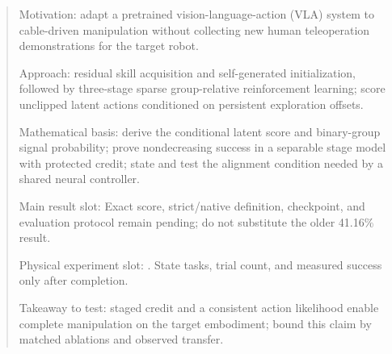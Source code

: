 \begin{abstract}
\begin{outline}
\item Motivation: adapt a pretrained vision-language-action (VLA) system to cable-driven manipulation without collecting new human teleoperation demonstrations for the target robot.
\item Approach: residual skill acquisition and self-generated initialization, followed by three-stage sparse group-relative reinforcement learning; score unclipped latent actions conditioned on persistent exploration offsets.
\item Mathematical basis: derive the conditional latent score and binary-group signal probability; prove nondecreasing success in a separable stage model with protected credit; state and test the alignment condition needed by a shared neural controller.
\item Main result slot:  Exact score, strict/native definition, checkpoint, and evaluation protocol remain pending; do not substitute the older 41.16\% result.
\item Physical experiment slot: . State tasks, trial count, and measured success only after completion.
\item Takeaway to test: staged credit and a consistent action likelihood enable complete manipulation on the target embodiment; bound this claim by matched ablations and observed transfer.
\end{outline}
\end{abstract}
